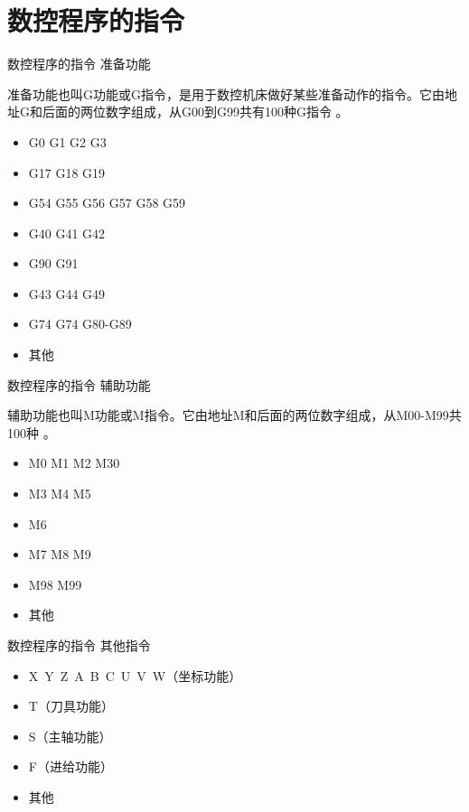\documentclass[UTF8,zihao=-4]{ctexbeamer}
\begin{document}
\section{数控程序的指令}

\begin{frame}{数控程序的指令}
 准备功能
 
 准备功能也叫G功能或G指令，是用于数控机床做好某些准备动作的指令。它由地址G和后面的两位数字组成，从G00到G99共有100种G指令 。 
\begin{itemize}
	\item  G0 G1 G2 G3
 \item G17 G18 G19
 \item G54 G55 G56 G57 G58 G59 
 \item  G40 G41 G42
 \item  G90 G91
 \item  G43 G44 G49
 \item  G74 G74 G80-G89
 \item  其他
\end{itemize}
 
\end{frame}

\begin{frame}{数控程序的指令}
	辅助功能
	
    辅助功能也叫M功能或M指令。它由地址M和后面的两位数字组成，从M00-M99共100种 。
    \begin{itemize}
		\item  M0 M1 M2 M30
		\item M3 M4 M5
		\item M6
		\item M7 M8 M9
		\item  M98 M99
		\item  其他
	\end{itemize}
	
\end{frame}

\begin{frame}{数控程序的指令}
	其他指令
	
	\begin{itemize}
        \item X~Y~Z~A~B~C~U~V~W（坐标功能）
		\item  T（刀具功能）
		\item S（主轴功能）
		\item F（进给功能）
		\item  其他
	\end{itemize}
	
\end{frame}
\end{document}
